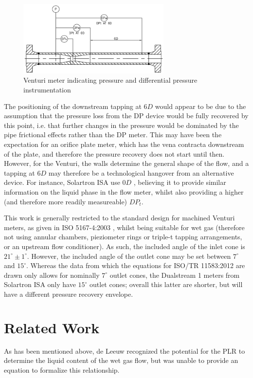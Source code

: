 \documentclass[journal]{IEEEtran}
\begin{document}
\begin{figure}[h]
\centering
\includegraphics[width=3.0in]{Venturi.png}
\caption[]{ Venturi meter indicating pressure and differential pressure\\instrumentation }
\label{fig:Venturi}
\end{figure}

The positioning of the downstream tapping at $6D$ would appear to be due to the assumption that the pressure loss from the DP device would be fully recovered by this point, i.e. that further changes in the pressure would be dominated by the pipe frictional effects rather than the DP meter.  This may have been the expectation for an orifice plate meter, which has the vena contracta downstream of the plate, and therefore the pressure recovery does not start until then.  However, for the Venturi, the walls determine the general shape of the flow, and a tapping at $6D$ may therefore be a technological hangover from an alternative device.  For instance, Solartron ISA use $0D$ \cite{Collins2017PLR1}, believing it to provide similar information on the liquid phase in the flow meter, whilst also providing a higher (and therefore more readily measureable) $DP_{t}$.


This work is generally restricted to the standard design for machined Venturi meters, as given in ISO 5167-4:2003 \cite{ISOTubes}, whilst being suitable for wet gas (therefore not using annular chambers, pieziometer rings or triple-t tapping arrangements, or an upstream flow conditioner).  As such, the included angle of the inlet cone is $21^{\circ} \pm 1^{\circ}$.  However, the included angle of the outlet cone may be set between $7^{\circ}$ and $15^{\circ}$.  Whereas the data from which the equations for ISO/TR 11583:2012 are drawn only allows for nominally $7^{\circ}$ outlet cones, the Dualstream 1 meters from Solartron ISA only have $15^{\circ}$ outlet cones; overall this latter are shorter, but will have a different pressure recovery envelope.

\section{Related Work}
As has been mentioned above, de Leeuw \cite{DeLeeuw1997} recognized the potential for the \acrshort{PLR} to determine the liquid content of the wet gas flow, but was unable to provide an equation to formalize this relationship.  
\end{document}
